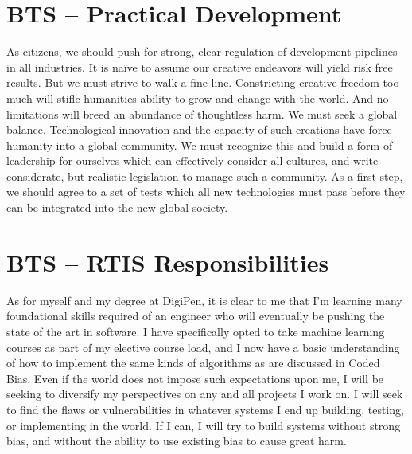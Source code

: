 \documentclass[sigconf, 10pt]{acmart}
\begin{document}
\section{BTS -- Practical Development}
As citizens, we should push for strong, clear regulation of development pipelines in all industries. It is naïve to assume our creative endeavors will yield risk free results. But we must strive to walk a fine line. Constricting creative freedom too much will stifle humanities ability to grow and change with the world. And no limitations will breed an abundance of thoughtless harm. We must seek a global balance. Technological innovation and the capacity of such creations have force humanity into a global community. We must recognize this and build a form of leadership for ourselves which can effectively consider all cultures, and write considerate, but realistic legislation to manage such a community. As a first step, we should agree to a set of tests which all new technologies must pass before they can be integrated into the new global society.
\section{BTS -- RTIS Responsibilities}
As for myself and my degree at DigiPen, it is clear to me that I’m learning many foundational skills required of an engineer who will eventually be pushing the state of the art in software. I have specifically opted to take machine learning courses as part of my elective course load, and I now have a basic understanding of how to implement the same kinds of algorithms as are discussed in Coded Bias. Even if the world does not impose such expectations upon me, I will be seeking to diversify my perspectives on any and all projects I work on. I will seek to find the flaws or vulnerabilities in whatever systems I end up building, testing, or implementing in the world. If I can, I will try to build systems without strong bias, and without the ability to use existing bias to cause great harm.

{}

\end{document}
